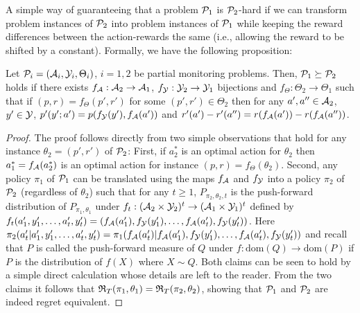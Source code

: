 A simple way of guaranteeing that a problem $\P_1$ is $\P_2$-hard if we can transform problem instances of $\P_2$ into 
problem instances of $\P_1$ while keeping the reward differences between the action-rewards the same (i.e., allowing the reward to be shifted by a constant).
Formally, we have the following proposition:
\begin{prop}
Let $\P_i = (\A_i,\Y_i,\Theta_i)$, $i=1,2$ be partial monitoring problems.
Then, $\P_1\succeq \P_2$ holds if there exists $f_{\A}:\A_2\to \A_1$, $f_{\Y}: \Y_2 \to \Y_1$ bijections and $f_{\Theta}:\Theta_2\to \Theta_1$ such that if $(p,r) = f_{\Theta}(p',r')$ for some $(p',r')\in \Theta_2$ then
for any $a',a''\in \A_2$, $y'\in \Y$,
$p'(y';a') = p(f_\Y(y'),f_\A(a'))$ and $r'(a')-r'(a'') = r(f_\A(a')) - r(f_\A(a''))$.
\end{prop}
\begin{proof}
The proof follows directly from two simple observations 
that hold for any instance $\theta_2 = (p',r')$ of $\P_2$: 
First, if $a_2^*$ is an optimal action for $\theta_2$
then $a_1^*=f_\A(a_2^*)$ is an optimal action for instance $(p,r) = f_\Theta(\theta_2)$.
Second, any policy $\pi_1$ of $\P_1$ can be translated using the maps $f_\A$ and $f_\Y$ into a policy $\pi_2$ of $\P_2$ (regardless of $\theta_2$) such that
for any $t\ge 1$,
$P_{\pi_2,\theta_2,t}$ is the push-forward distribution 
of $P_{\pi_1,\theta_1}$ under $f_t:(\A_2\times \Y_2)^t \to (\A_1\times \Y_1)^t$
defined by $f_t(a_1',y_1',\dots,a_t',y_t') = (f_\A(a_1'),f_\Y(y_1'),\dots,f_\A(a_t'),f_\Y(y_t'))$. 
Here $\pi_2(a'_t|a_1',y_1',\dots,a_t',y_t') = \pi_1( f_\A(a_t')| f_\A(a_1'),f_\Y(y_1'),\dots,f_\A(a_t'),f_\Y(y_t'))$ and recall that $P$ is called the push-forward measure of $Q$ under $f:\mathrm{dom}(Q)\to \mathrm{dom}(P)$ if $P$ is the distribution of $f(X)$ where $X\sim Q$.
Both claims can be seen to hold by a simple direct calculation whose details are left 
to the reader.
From the two claims it follows that $\Regret_T(\pi_1,\theta_1)
= \Regret_T(\pi_2,\theta_2)$, showing that $\P_1$ and $\P_2$ are indeed
regret equivalent.
\end{proof}

\fi



%
%

